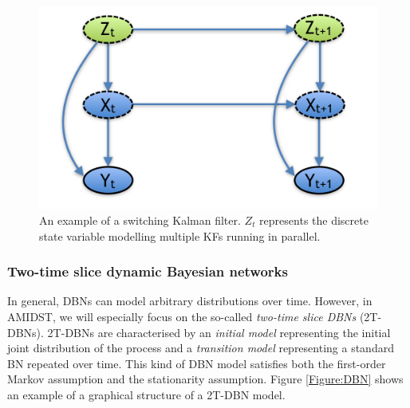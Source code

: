 \begin{figure}[ht!]
\begin{center}
\includegraphics[scale=0.4]{./figures/PreliminariesSKF}
\caption{\label{Figure:SKF} An example of a switching Kalman filter. $Z_t$ represents the discrete state variable modelling multiple KFs running in parallel.}
\end{center}
\end{figure}

\subsubsection{Two-time slice dynamic Bayesian networks}\label{SubSubSection:2DBNs}	

In general, DBNs can model arbitrary distributions over time. However, in AMIDST,  we will especially focus on the so-called \textit{two-time slice DBNs} (2T-DBNs). 2T-DBNs are characterised by an \textit{initial model} representing the initial joint distribution of the process and a \textit{transition model} representing a standard BN repeated over time. This kind of DBN model satisfies both the first-order Markov assumption and the stationarity assumption. Figure \ref{Figure:DBN} shows an example of a graphical structure of a 2T-DBN model. 

